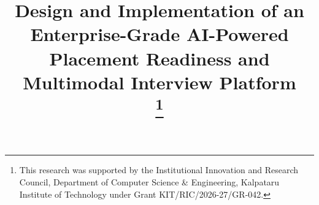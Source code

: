 \documentclass[conference]{IEEEtran}
\begin{document}
\title{Design and Implementation of an Enterprise-Grade AI-Powered Placement Readiness and Multimodal Interview Platform\\
\thanks{This research was supported by the Institutional Innovation and Research Council, Department of Computer Science \& Engineering, Kalpataru Institute of Technology under Grant KIT/RIC/2026-27/GR-042.}
}

\author{
}

\maketitle
\end{document}
